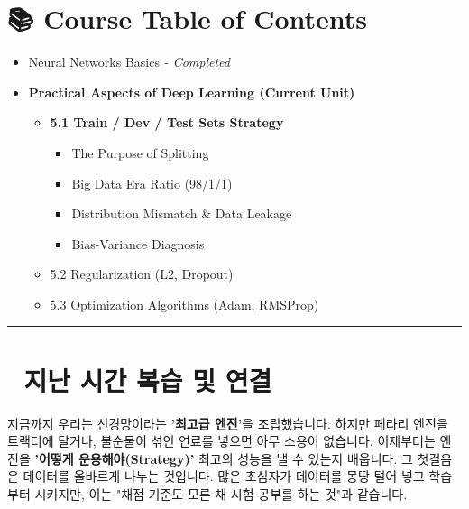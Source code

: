 \documentclass[11pt,a4paper]{book}
\theoremstyle{definition}
\begin{document}
\section*{📚 Course Table of Contents}
\begin{itemize}
    \item[Chapter 1-4.] Neural Networks Basics \textit{- Completed}
    \item[\textbf{Chapter 5.}] \textbf{Practical Aspects of Deep Learning (Current Unit)}
    \begin{itemize}
        \item \textbf{5.1 Train / Dev / Test Sets Strategy}
        \begin{itemize}
            \item The Purpose of Splitting
            \item Big Data Era Ratio (98/1/1)
            \item Distribution Mismatch \& Data Leakage
            \item Bias-Variance Diagnosis
        \end{itemize}
        \item 5.2 Regularization (L2, Dropout)
        \item 5.3 Optimization Algorithms (Adam, RMSProp)
    \end{itemize}
\end{itemize}

\vspace{0.5cm}
\hrule
\vspace{0.5cm}

\section*{🔗 지난 시간 복습 및 연결}
지금까지 우리는 신경망이라는 \textbf{'최고급 엔진'}을 조립했습니다. 하지만 페라리 엔진을 트랙터에 달거나, 불순물이 섞인 연료를 넣으면 아무 소용이 없습니다.
이제부터는 엔진을 \textbf{'어떻게 운용해야(Strategy)'} 최고의 성능을 낼 수 있는지 배웁니다. 그 첫걸음은 데이터를 올바르게 나누는 것입니다. 많은 초심자가 데이터를 몽땅 털어 넣고 학습부터 시키지만, 이는 "채점 기준도 모른 채 시험 공부를 하는 것"과 같습니다.

\end{document}
